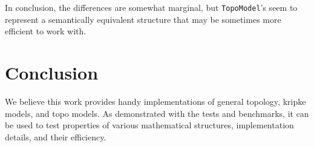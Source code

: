 \documentclass[12pt,a4paper]{article}
\begin{document}
In conclusion, the differences are somewhat marginal, but \verb|TopoModel|'s seem to represent a semantically
equivalent structure that may be sometimes more efficient to work with.

\section{Conclusion}
We believe this work provides handy implementations of general topology, kripke models, and topo models. As demonstrated
with the tests and benchmarks, it can be used to test properties of various mathematical structures, implementation details,
and their efficiency.



\end{document}

